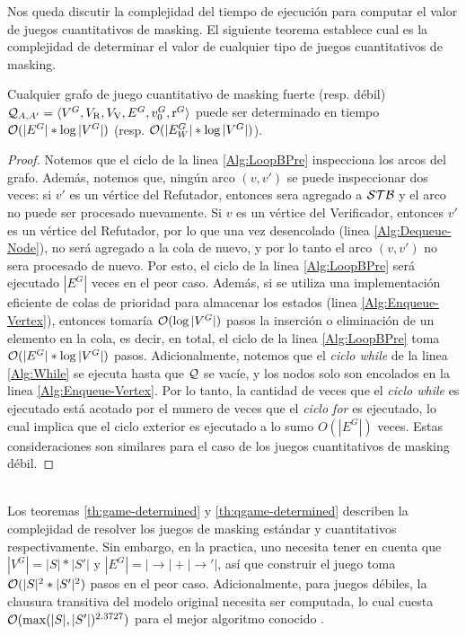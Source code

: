 Nos queda discutir la complejidad del tiempo de ejecución para computar el valor de juegos cuantitativos de masking. 
El siguiente teorema establece cual es la complejidad de determinar el valor de cualquier tipo de juegos cuantitativos de masking.
%
\sloppy \begin{thm}\label{th:qgame-determined} Cualquier grafo de juego cuantitativo de masking fuerte (resp. débil) 
$\mathcal{Q}_{A, A'} = \langle V^G, V_{\mathrm{R}}, V_{\mathrm{V}}, E^G, v_0^G, \operatorname{r}^G \rangle$ puede ser determinado en tiempo $\mathcal{O}(|E^G|*\log |V^G|)$ (resp. $\mathcal{O}(|E_W^G|*\log |V^G|)$).
\end{thm}
\begin{proof}
	Notemos que el ciclo de la linea \ref{Alg:LoopBPre} inspecciona los arcos del grafo. Además, notemos que, ningún arco $(v, v')$ se puede inspeccionar dos veces:
	si $v'$ es un vértice del Refutador, entonces sera agregado a $\mathcal{STB}$ y el arco no puede ser procesado nuevamente. 
	Si $v$ es un vértice del Verificador, entonces $v'$ es un vértice del Refutador, por lo que una vez desencolado (linea \ref{Alg:Dequeue-Node}), no será agregado a la cola de nuevo, y por lo tanto el arco $(v, v')$ no sera procesado de nuevo. Por esto, el ciclo de la linea \ref{Alg:LoopBPre} será ejecutado $|E^G|$ veces en el peor caso. 
	Además, si se utiliza una implementación eficiente de colas de prioridad para almacenar los estados (linea \ref{Alg:Enqueue-Vertex}), 
	entonces tomaría $\mathcal{O}(\log |V^G|)$ pasos la inserción o eliminación de un elemento en la cola, es decir, en total, el ciclo de la linea \ref{Alg:LoopBPre} toma $\mathcal{O}(|E^G|*\log |V^G|)$ pasos.
	Adicionalmente, notemos que el \emph{ciclo while} de la linea \ref{Alg:While} se ejecuta hasta que $\mathcal{Q}$ se vacíe, y los nodos solo son encolados en la linea \ref{Alg:Enqueue-Vertex}. Por lo tanto, la cantidad de veces que el \emph{ciclo while} es ejecutado está acotado por el numero de veces que el \emph{ciclo for} 	es ejecutado, lo cual implica que el ciclo exterior es ejecutado a lo sumo $O(|E^G|)$ veces. Estas consideraciones son similares para el caso de los juegos cuantitativos de masking débil.	

\qedhere
\end{proof} \\

Los teoremas \ref{th:game-determined} y \ref{th:qgame-determined} describen la complejidad de resolver los juegos de masking estándar y cuantitativos respectivamente. Sin embargo, en la practica, uno necesita tener en cuenta que $|V^G| = |S|*|S'|$ y $|E^G| = |{\rightarrow}|+|{\rightarrow'}|$, así que construir el juego toma 
$\mathcal{O}(|S|^2*|S'|^2)$ pasos en el peor caso. Adicionalmente, para juegos débiles, la clausura transitiva del modelo original necesita ser computada, lo cual cuesta $\mathcal{O}(\max(|S|,|S'|)^{2.3727})$ para el mejor algoritmo conocido \cite{Wil12}.


